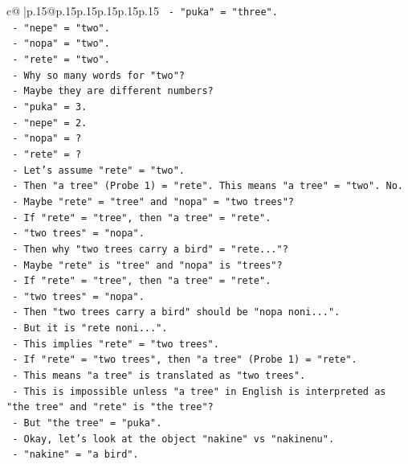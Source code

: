\documentclass{article}
\begin{document}
{\begin{supertabular}{c@{$\;$}|p{.15\linewidth}@{}p{.15\linewidth}p{.15\linewidth}p{.15\linewidth}p{.15\linewidth}p{.15\linewidth}}
{{{\texttt{   {-} "puka" = "three".} \\
\texttt{   {-} "nepe" = "two".} \\
\texttt{   {-} "nopa" = "two".} \\
\texttt{   {-} "rete" = "two".} \\
\texttt{   {-} Why so many words for "two"?} \\
\texttt{   {-} Maybe they are different numbers?} \\
\texttt{   {-} "puka" = 3.} \\
\texttt{   {-} "nepe" = 2.} \\
\texttt{   {-} "nopa" = ?} \\
\texttt{   {-} "rete" = ?} \\
\texttt{   {-} Let's assume "rete" = "two".} \\
\texttt{   {-} Then "a tree" (Probe 1) = "rete". This means "a tree" = "two". No.} \\
\texttt{   {-} Maybe "rete" = "tree" and "nopa" = "two trees"?} \\
\texttt{   {-} If "rete" = "tree", then "a tree" = "rete".} \\
\texttt{   {-} "two trees" = "nopa".} \\
\texttt{   {-} Then why "two trees carry a bird" = "rete..."?} \\
\texttt{   {-} Maybe "rete" is "tree" and "nopa" is "trees"?} \\
\texttt{   {-} If "rete" = "tree", then "a tree" = "rete".} \\
\texttt{   {-} "two trees" = "nopa".} \\
\texttt{   {-} Then "two trees carry a bird" should be "nopa noni...".} \\
\texttt{   {-} But it is "rete noni...".} \\
\texttt{   {-} This implies "rete" = "two trees".} \\
\texttt{   {-} If "rete" = "two trees", then "a tree" (Probe 1) = "rete".} \\
\texttt{   {-} This means "a tree" is translated as "two trees".} \\
\texttt{   {-} This is impossible unless "a tree" in English is interpreted as "the tree" and "rete" is "the tree"?} \\
\texttt{   {-} But "the tree" = "puka".} \\
\texttt{   {-} Okay, let's look at the object "nakine" vs "nakinenu".} \\
\texttt{   {-} "nakine" = "a bird".} \\
}}}
\end{supertabular}}
\end{document}
